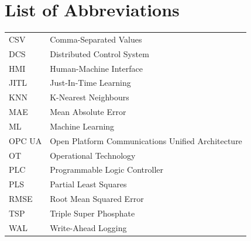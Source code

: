 \chapter*{List of Abbreviations}
\begin{longtable}{L{0.18\textwidth}L{0.74\textwidth}}
\toprule
{} & \\\midrule\endhead
CSV & Comma-Separated Values\\
DCS & Distributed Control System\\
HMI & Human-Machine Interface\\
JITL & Just-In-Time Learning\\
KNN & K-Nearest Neighbours\\
MAE & Mean Absolute Error\\
ML & Machine Learning\\
OPC UA & Open Platform Communications Unified Architecture\\
OT & Operational Technology\\
PLC & Programmable Logic Controller\\
PLS & Partial Least Squares\\
RMSE & Root Mean Squared Error\\
TSP & Triple Super Phosphate\\
WAL & Write-Ahead Logging\\\bottomrule
\end{longtable}
